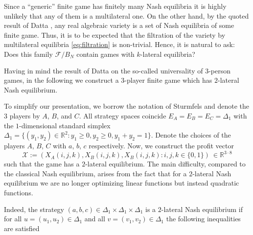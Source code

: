 \documentclass[a4paper,11pt,reqno,english]{amsart}
\theoremstyle{plain}
\theoremstyle{definition}
\begin{document}
\medskip
Since a ``generic'' finite game has finitely many Nash equilibria it is highly unlikely that any of them is a multilateral one.
On the other hand, by the quoted result of Datta \cite[Thm.\,1]{Datta2003b}, any real algebraic variety is a set of Nash equilibria of some finite game.
Thus, it is to be expected that the filtration of the variety by multilateral equilibria \eqref{eq:filtration} is non-trivial.
Hence, it is natural to ask: Does this family $\mathcal{F}/B_N$ contain games with $k$-lateral equilibria?

\medskip
Having in mind the result of Datta on the so-called universality of $3$-person games, in the following we construct a $3$-player finite game which has $2$-lateral Nash equilibrium.

\medskip
To simplify our presentation, we borrow the notation of Sturmfels \cite{Sturmfels2002} and denote the $3$ players by $A$, $B$, and $C$.
All strategy spaces coincide $E_A=E_B=E_C=\Delta_1$ with the $1$-dimensional standard simplex $\Delta_1=\{(y_1,y_2)\in\mathbb{R}^2 : y_1\geq 0, y_2\geq 0, y_1+y_2=1\}$.
Denote the choices of the players $A$, $B$, $C$ with $a$, $b$, $c$ respectively.
Now, we construct the profit vector
\begin{equation}\label{eq:profit_vector}
	\mathcal{X}:=(X_A(i,j,k), X_B(i,j,k), X_B(i,j,k) : i,j,k\in \{0,1\})\ \in \mathbb{R}^{3\cdot 8}
\end{equation}
such that the game has a $2$-lateral equilibrium.
The main difficulty, compared to the classical Nash equilibrium, arises from the fact that for a $2$-lateral Nash equilibrium we are no longer optimizing linear functions but instead quadratic functions.

\medskip
Indeed, the strategy $(a,b,c)\in \Delta_1\times\Delta_1\times\Delta_1$ is a $2$-lateral Nash equilibrium if for all $u=(u_1,u_2)\in\Delta_1$ and all $v=(v_1,v_2)\in \Delta_1$ the following inequalities are satisfied
\end{document}
